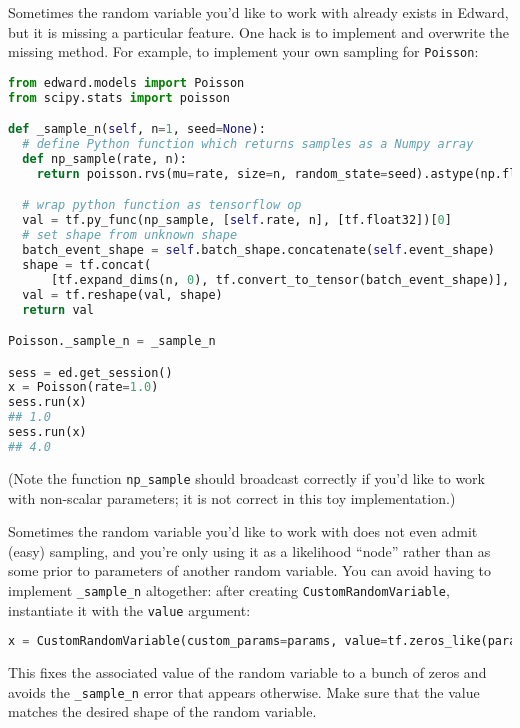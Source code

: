Sometimes the random variable you'd like to work with already exists
in Edward, but it is missing a particular feature. One hack is to
implement and overwrite the missing method. For example, to implement
your own sampling for \texttt{Poisson}:

\begin{lstlisting}[language=Python]
from edward.models import Poisson
from scipy.stats import poisson

def _sample_n(self, n=1, seed=None):
  # define Python function which returns samples as a Numpy array
  def np_sample(rate, n):
    return poisson.rvs(mu=rate, size=n, random_state=seed).astype(np.float32)

  # wrap python function as tensorflow op
  val = tf.py_func(np_sample, [self.rate, n], [tf.float32])[0]
  # set shape from unknown shape
  batch_event_shape = self.batch_shape.concatenate(self.event_shape)
  shape = tf.concat(
      [tf.expand_dims(n, 0), tf.convert_to_tensor(batch_event_shape)], 0)
  val = tf.reshape(val, shape)
  return val

Poisson._sample_n = _sample_n

sess = ed.get_session()
x = Poisson(rate=1.0)
sess.run(x)
## 1.0
sess.run(x)
## 4.0
\end{lstlisting}

(Note the function \texttt{np\_sample} should broadcast correctly if
you'd like to work with non-scalar parameters; it is not correct in
this toy implementation.)

Sometimes the random variable you'd like to work with does not even
admit (easy) sampling, and you're only using it as a likelihood ``node'' rather
than as some prior to parameters of another random variable.
You can avoid having to implement \texttt{\_sample\_n} altogether:
after creating \texttt{CustomRandomVariable}, instantiate it with the
\texttt{value} argument:

\begin{lstlisting}[language=Python]
x = CustomRandomVariable(custom_params=params, value=tf.zeros_like(params))
\end{lstlisting}

This fixes the associated value of the random variable to a bunch of
zeros and avoids the \texttt{\_sample\_n} error that appears otherwise.
Make sure that the value matches the desired shape of the random
variable.
